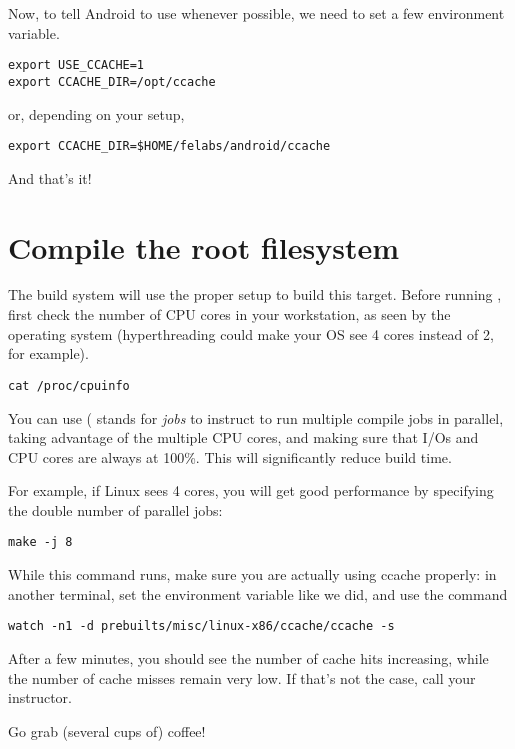 Now, to tell Android to use  whenever possible, we need
to set a few environment variable.

\begin{verbatim}
export USE_CCACHE=1
export CCACHE_DIR=/opt/ccache
\end{verbatim}
or, depending on your setup,
\begin{verbatim}
export CCACHE_DIR=$HOME/felabs/android/ccache
\end{verbatim}

And that's it!

\section{Compile the root filesystem}

The build system will use the proper setup to build this
target. Before running , first check the number of CPU
cores in your workstation, as seen by the operating system
(hyperthreading could make your OS see 4 cores instead of 2, for
example).

\begin{verbatim}
cat /proc/cpuinfo
\end{verbatim}

You can use  ( stands for {\it jobs} to instruct
 to run multiple compile jobs in parallel, taking advantage
of the multiple CPU cores, and making sure that I/Os and CPU cores are
always at 100\%. This will significantly reduce build time.

For example, if Linux sees 4 cores, you will get good performance by
specifying the double number of parallel jobs:

\begin{verbatim}
make -j 8
\end{verbatim}

While this command runs, make sure you are actually using ccache
properly: in another terminal, set the  environment
variable like we did, and use the command

\begin{verbatim}
watch -n1 -d prebuilts/misc/linux-x86/ccache/ccache -s
\end{verbatim}

After a few minutes, you should see the number of cache hits
increasing, while the number of cache misses remain very low. If
that's not the case, call your instructor.

Go grab (several cups of) coffee!

